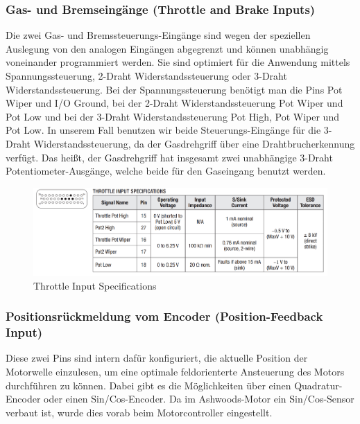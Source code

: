 \newpage



\subsubsection{Gas- und Bremseingänge (Throttle and Brake Inputs)}
Die zwei Gas- und Bremssteuerungs-Eingänge sind wegen der speziellen Auslegung von den analogen Eingängen abgegrenzt und können unabhängig voneinander programmiert werden. Sie sind optimiert für die Anwendung mittels Spannungssteuerung, 2-Draht Widerstandssteuerung oder 3-Draht Widerstandssteuerung. Bei der Spannungssteuerung benötigt man die Pins Pot Wiper und I/O Ground, bei der 2-Draht Widerstandssteuerung Pot Wiper und Pot Low und bei der 3-Draht Widerstandssteuerung Pot High, Pot Wiper und Pot Low. In unserem Fall benutzen wir beide Steuerungs-Eingänge für die 3-Draht Widerstandssteuerung, da der Gasdrehgriff über eine Drahtbrucherkennung verfügt. Das heißt, der Gasdrehgriff hat insgesamt zwei unabhängige 3-Draht Potentiometer-Ausgänge, welche beide für den Gaseingang benutzt werden.

\begin{figure}[H]
	\begin{center}
		\includegraphics[width=\textwidth]{figures/antrieb/Throttle_Input_Specifications.png}
		\caption{Throttle Input Specifications}
	\end{center}
\end{figure}



\subsubsection{Positionsrückmeldung vom Encoder (Position-Feedback Input)}
Diese zwei Pins sind intern dafür konfiguriert, die aktuelle Position der Motorwelle einzulesen, um eine optimale feldorienterte Ansteuerung des Motors durchführen zu können. Dabei gibt es die Möglichkeiten über einen Quadratur-Encoder oder einen Sin/Cos-Encoder. Da im Ashwoods-Motor ein Sin/Cos-Sensor verbaut ist, wurde dies vorab beim Motorcontroller eingestellt.


